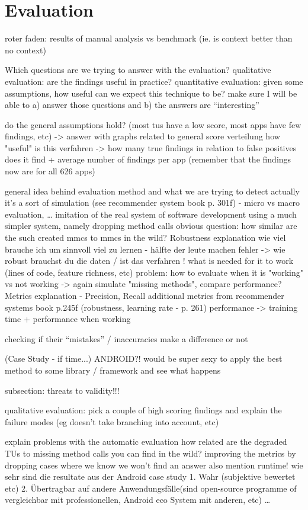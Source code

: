 \chapter{Evaluation}\label{ch:eval}
roter faden: results of manual analysis vs benchmark (ie. is context better than no context)

Which questions are we trying to answer with the evaluation?
    qualitative evaluation: are the findings useful in practice?
    quantitative evaluation: given some assumptions, how useful can we expect this technique to be?
    make sure I will be able to a) answer those questions and b) the answers are ``interesting''

    do the general assumptions hold? (most tus have a low score, most apps have few findings, etc)
        -> answer with graphs related to general score verteilung
	how "useful" is this verfahren -> how many true findings in relation to false positives does it find + average number of findings per app (remember that the findings now are for all 626 apps)

general idea behind evaluation method and what we are trying to detect
actually it's a sort of simulation (see recommender system book p. 301f) - micro vs macro evaluation, \ldots
    imitation of the real system of software development
    using a much simpler system, namely dropping method calls
    obvious question: how similar are the such created mmcs to mmcs in the wild?
Robustness explanation
    wie viel brauche ich um sinnvoll viel zu lernen - hälfte der leute machen fehler -> wie robust brauchst du die daten / ist das verfahren !
    what is needed for it to work (lines of code, feature richness, etc) 
    problem: how to evaluate when it is "working" vs not working -> again simulate "missing methods", compare performance?
Metrics explanation - Precision, Recall
    additional metrics from recommender systems book p.245f (robustness, learning rate - p. 261)
    performance -> training time + performance when working


checking if their ``mistakes'' / inaccuracies make a difference or not

(Case Study - if time...)
    ANDROID?!
    would be super sexy to apply the best method to some library / framework and see what happens

subsection: threats to validity!!!

qualitative evaluation:
    pick a couple of high scoring findings and explain the failure modes (eg doesn't take branching into account, etc)

explain problems with the automatic evaluation
    how related are the degraded TUs to missing method calls you can find in the wild?
    improving the metrics by dropping cases where we know we won't find an answer
    also mention runtime!
    wie sehr sind die resultate aus der Android case study 1. Wahr (subjektive bewertet etc) 2. Übertragbar auf andere Anwendungsfälle(sind open-source programme of vergleichbar mit professionellen, Android eco System mit anderen, etc)
    \ldots
